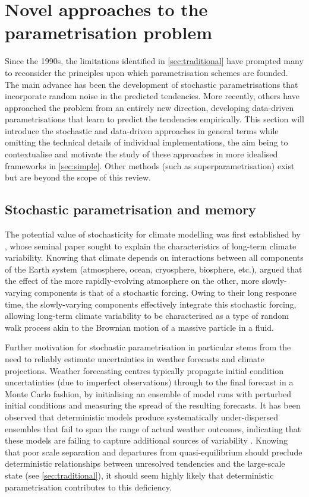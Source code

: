 \documentclass[titlepage,twoside]{article}
\numberwithin{equation}{section}
\begin{document}
\clearpage
\section{Novel approaches to the parametrisation problem}%
\label{sec:novel}
Since the 1990s, the limitations identified in \cref{sec:traditional} have
prompted many to reconsider the principles upon which parametrisation schemes
are founded. The main advance has been the development of stochastic
parametrisations that incorporate random noise in the predicted tendencies.
More recently, others have approached the problem from an entirely new
direction, developing data-driven parametrisations that learn to predict the
tendencies empirically. This section will introduce the stochastic and
data-driven approaches in general terms while omitting the technical details of
individual implementations, the aim being to contextualise and motivate the
study of these approaches in more idealised frameworks in \cref{sec:simple}.
Other methods (such as superparametrisation) exist but are beyond the scope of
this review.


\subsection{Stochastic parametrisation and memory} \label{sec:stochastic}
The potential value of stochasticity for climate modelling was first
established by \textcite{hasselmann1976}, whose seminal paper sought to explain
the characteristics of long-term climate variability. Knowing that climate
depends on interactions between all components of the Earth system
(atmosphere, ocean, cryosphere, biosphere, etc.), \citeauthor{hasselmann1976}
argued that the effect of the more rapidly-evolving atmosphere on the other,
more slowly-varying components is that of a stochastic forcing. Owing to
their long response time, the slowly-varying components effectively integrate
this stochastic forcing, allowing long-term climate variability to be
characterised as a type of random walk process akin to the Brownian motion
of a massive particle in a fluid.

Further motivation for stochastic parametrisation in particular stems from the
need to reliably estimate uncertainties in weather forecasts and climate
projections. Weather forecasting centres typically propagate initial condition
uncertatinties (due to imperfect observations) through to the final forecast in
a Monte Carlo fashion, by initialising an ensemble of model runs with perturbed
initial conditions and measuring the spread of the resulting forecasts. It has
been observed that deterministic models produce systematically under-dispersed
ensembles that fail to span the range of actual weather outcomes, indicating
that these models are failing to capture additional sources of variability
\parencite{palmer2005,berner2017,palmer2019}. Knowing that poor scale
separation and departures from quasi-equilibrium should preclude deterministic
relationships between unresolved tendencies and the large-scale state (see
\cref{sec:traditional}), it should seem highly likely that deterministic
parametrisation contributes to this deficiency.
\end{document}
